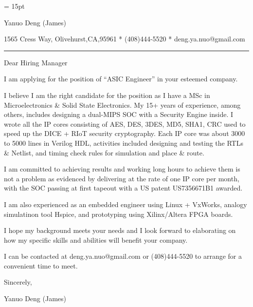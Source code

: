 

  \FFrg \baselineskip = 15pt

{
Yanuo Deng (James)
}

{ 
1565 Cress Way, Olivehurst,CA,95961
*
(408)444-5520
*
deng.ya.nuo@gmail.com
}

{ \smallbreak } 
{\par\noindent\hrule} 
{ \medbreak } { 
}

%
%

{ \bigbreak } 

{ 
Dear Hiring Manager
}

{ \bigbreak } 
I am applying for the position of ``ASIC Engineer'' in your esteemed company.

{ \bigbreak } 
I believe I am the right candidate for the position as I have a MSc in Microelectronics \& Solid State Electronics.
My 15+ years of experience, among others, 
includes designing a dual-MIPS SOC with a Security Engine inside. 
I wrote all the IP cores consisting of AES, DES, 3DES, MD5, SHA1, CRC 
used to speed up the DICE + RIoT security cryptography.
Each IP core was about 3000 to 5000 lines in Verilog HDL, 
activities included designing and testing the RTLs \& Netlist,
and timing check rules for simulation and place \& route.

{ \bigbreak } 
I am committed to achieving results and working long hours 
to achieve them is not a problem as evidenced by 
delivering at the rate of one IP core per month,
with the SOC passing at first tapeout
with a US patent US7356671B1 awarded.

{ \bigbreak } 
I am also experienced as an embedded engineer using Linux + VxWorks, 
analogy simulatinon tool Hspice, 
and prototyping using Xilinx/Altera FPGA boards.

{ \bigbreak } 
I hope my background meets your needs and I look
forward to elaborating on how my specific skills and abilities will benefit your company.

{ \bigbreak } 
I can be contacted at deng.ya.nuo@gmail.com
or (408)444-5520 to arrange for a convenient time to meet.

{ \bigbreak } 




\vskip 60pt

{ \bigbreak } 
Sincerely,

Yanuo Deng (James)

\bye
